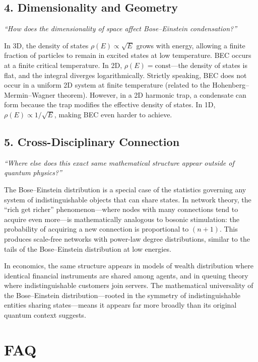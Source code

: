 \subsection*{4. Dimensionality and Geometry}
\textit{``How does the dimensionality of space affect Bose--Einstein condensation?''}

In 3D, the density of states $\rho(E) \propto \sqrt{E}$ grows with energy, allowing a finite fraction of particles to remain in excited states at low temperature. BEC occurs at a finite critical temperature. In 2D, $\rho(E) = \text{const}$---the density of states is flat, and the integral diverges logarithmically. Strictly speaking, BEC does not occur in a uniform 2D system at finite temperature (related to the Hohenberg--Mermin--Wagner theorem). However, in a 2D harmonic trap, a condensate can form because the trap modifies the effective density of states. In 1D, $\rho(E) \propto 1/\sqrt{E}$, making BEC even harder to achieve.

\subsection*{5. Cross-Disciplinary Connection}
\textit{``Where else does this exact same mathematical structure appear outside of quantum physics?''}

The Bose--Einstein distribution is a special case of the statistics governing any system of indistinguishable objects that can share states. In network theory, the ``rich get richer'' phenomenon---where nodes with many connections tend to acquire even more---is mathematically analogous to bosonic stimulation: the probability of acquiring a new connection is proportional to $(n + 1)$. This produces scale-free networks with power-law degree distributions, similar to the tails of the Bose--Einstein distribution at low energies.

In economics, the same structure appears in models of wealth distribution where identical financial instruments are shared among agents, and in queuing theory where indistinguishable customers join servers. The mathematical universality of the Bose--Einstein distribution---rooted in the symmetry of indistinguishable entities sharing states---means it appears far more broadly than its original quantum context suggests.


\section*{FAQ}

